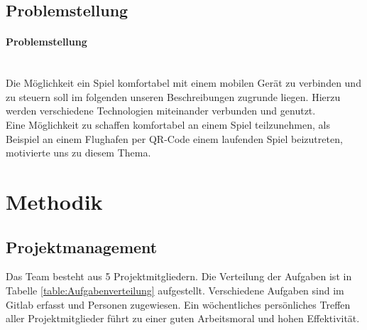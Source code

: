 \documentclass[a4paper]{spie}  %
\begin{document}
\subsection{Problemstellung}

		\paragraph{Problemstellung}\mbox{}\\
Die Möglichkeit ein Spiel komfortabel mit einem mobilen Gerät zu verbinden und zu steuern soll im folgenden unseren Beschreibungen zugrunde liegen. Hierzu werden verschiedene Technologien miteinander verbunden und genutzt.\\
Eine Möglichkeit zu schaffen komfortabel an einem Spiel teilzunehmen, als Beispiel an einem Flughafen per QR-Code einem laufenden Spiel beizutreten, motivierte uns zu diesem Thema.


\section{Methodik}
\subsection{Projektmanagement}
Das Team besteht aus 5 Projektmitgliedern. Die Verteilung der Aufgaben ist in Tabelle \ref{table:Aufgabenverteilung} aufgestellt.
Verschiedene Aufgaben sind im Gitlab erfasst und Personen zugewiesen. Ein wöchentliches persönliches Treffen aller Projektmitglieder führt zu einer guten Arbeitsmoral und hohen Effektivität.
\end{document}
